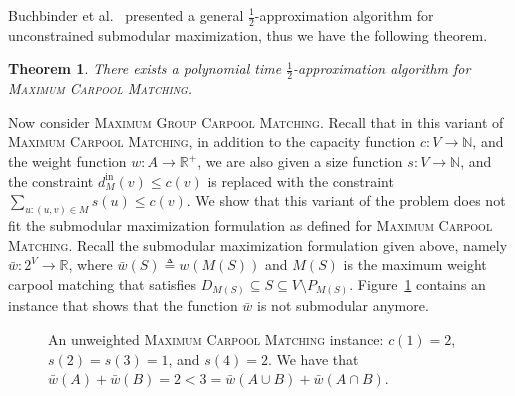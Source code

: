 \documentclass[11pt]{article}
\newtheorem{theorem}{Theorem}
\newcommand{\eqdf}{\triangleq}
\newcommand{\half}{\frac{1}{2}}
\def\R{\mathbb{R}}
\def\N{\mathbb{N}}
\newcommand{\din}[1][M]{d^{\text{in}}_{#1}}
\newcommand{\carpool}{\textsc{Maximum Carpool Matching}\xspace}
\newcommand{\gcp}{\textsc{Maximum Group Carpool Matching}\xspace}
\newcommand{\barw}{\bar{w}}
\begin{document}
Buchbinder et al.~\cite{BFNS15,buchbinder2016deterministic} presented
a general $\half$-approximation algorithm for unconstrained
submodular maximization, thus we have the following theorem.

\begin{theorem}
There exists a polynomial time $\half$-approximation algorithm
for \carpool.
\end{theorem}


Now consider \gcp.  Recall that in this variant of \carpool, in
addition to the capacity function $c:V \to \N$, and the weight
function $w:A \to \R^+$, we are also given a size function $s:V \to
\N$, and the constraint $\din[M](v) \leq c(v)$ is replaced with the
constraint $\sum_{u:(u,v) \in M} s(u) \leq c(v)$.
%
%
We show that this variant of the problem does not fit the submodular
maximization formulation as defined for \carpool.
%
Recall the submodular maximization formulation given above,
namely $\barw: 2^V \to \R$, where $\barw(S)
\eqdf w(M(S))$ and $M(S)$ is the maximum weight carpool matching that
satisfies $D_{M(S)} \subseteq S \subseteq V \setminus P_{M(S)}$.
%
Figure~\ref{fig:not submodular} contains an instance that shows that
the function $\barw$ is not submodular anymore.

\begin{figure}[!t]
\begin{center}
\end{center}
\caption{An unweighted \carpool instance: $c(1) = 2$, $s(2) = s(3) =
  1$, and $s(4) = 2$.  We have that $\barw(A) + \barw(B) = 2 < 3 =
  \barw(A \cup B) + \barw(A \cap B)$.}
\label{fig:not submodular}
\end{figure}
\end{document}
